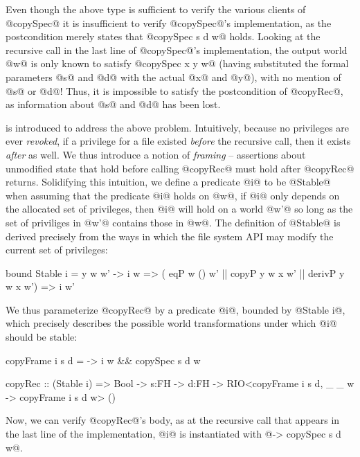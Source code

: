 Even though the above type is sufficient to verify
the various clients of @copySpec@ it
is insufficient to verify @copySpec@'s implementation, 
as the postcondition merely states that @copySpec s d w@ holds.
%
Looking at the recursive call in the last line of @copySpec@'s implementation,
the output world @w@ is only known to satisfy @copySpec x y w@ (having
substituted the formal parameters @s@ and @d@ with the actual @x@ and
@y@), with no mention of @s@ or @d@!
%
Thus, it is impossible to satisfy the postcondition of @copyRec@, as
information about @s@ and @d@ has been lost.

 is introduced to address the above problem.
Intuitively, because no privileges are ever
\emph{revoked}, if a privilege for a file existed \emph{before} the
recursive call, then it exists \emph{after} as well.
%
We thus introduce a notion of \emph{framing} -- assertions about
unmodified state that hold before calling @copyRec@ must hold after
@copyRec@ returns.
%
Solidifying this intuition, we define a predicate @i@ to be @Stable@
when assuming that the predicate @i@
holds on @w@, if @i@ only depends on the allocated set of 
privileges, then @i@ will hold on a world @w'@ so long as
the set of priviliges in @w'@ contains those in @w@.
%
The definition of @Stable@ is derived precisely from the ways in which
the file system API may modify the current set of privileges:
%
\begin{code}
  bound Stable i = \x y w w' -> 
   i w => ( eqP w () w' || copyP y w x w' || derivP y w x w') 
       => i w'
\end{code}
%
We thus parameterize @copyRec@ by a predicate @i@, bounded by @Stable i@, 
which precisely describes the possible world transformations under which 
@i@ should be stable:
%
\begin{code}
  copyFrame i s d = \w -> i w && copySpec s d w

  copyRec :: (Stable i)
          => Bool -> s:FH -> d:FH
          -> RIO<copyFrame i s d, \_ _ w -> copyFrame i s d w> () 
\end{code}              
%
Now, we can verify @copyRec@'s body, as
at the recursive call that appears in the last line of the implementation,
@i@ is instantiated with 
%
@\w -> copySpec s d w@.

